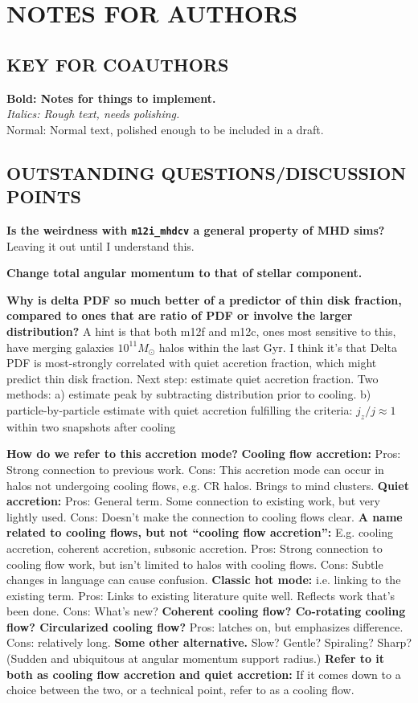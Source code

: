 \documentclass[fleqn,usenatbib]{mnras}
\begin{document}
\section{NOTES FOR AUTHORS}

\subsection{KEY FOR COAUTHORS}
\textbf{Bold: Notes for things to implement.} \\
\textit{Italics: Rough text, needs polishing.} \\
Normal: Normal text, polished enough to be included in a draft.

\subsection{OUTSTANDING QUESTIONS/DISCUSSION POINTS}

\textbf{Is the weirdness with \texttt{m12i\_mhdcv} a general property of MHD sims?}
Leaving it out until I understand this.

\textbf{Change total angular momentum to that of stellar component.}

\textbf{Why is delta PDF so much better of a predictor of thin disk fraction, compared to ones that are ratio of PDF or involve the larger distribution?}
A hint is that both m12f and m12c, ones most sensitive to this, have merging galaxies $10^11 M_\odot$ halos within the last Gyr.
I think it's that Delta PDF is most-strongly correlated with quiet accretion fraction, which might predict thin disk fraction.
Next step: estimate quiet accretion fraction.
Two methods:
a) estimate peak by subtracting distribution prior to cooling.
b) particle-by-particle estimate with quiet accretion fulfilling the criteria: $j_z/j \approx 1$ within two snapshots after cooling

\textbf{How do we refer to this accretion mode?}
\textbf{Cooling flow accretion:}
Pros: Strong connection to previous work.
Cons: This accretion mode can occur in halos not undergoing cooling flows, e.g. CR halos.
Brings to mind clusters.
\textbf{Quiet accretion:}																																									
Pros: General term. Some connection to existing work, but very lightly used.
Cons: Doesn't make the connection to cooling flows clear.
\textbf{A name related to cooling flows, but not ``cooling flow accretion'':}
E.g. cooling accretion, coherent accretion, subsonic accretion.
Pros: Strong connection to cooling flow work, but isn't limited to halos with cooling flows.
Cons: Subtle changes in language can cause confusion.
\textbf{Classic hot mode:}
i.e. linking to the existing term.
Pros: Links to existing literature quite well. Reflects work that's been done.
Cons: What's new?
\textbf{Coherent cooling flow? Co-rotating cooling flow? Circularized cooling flow?}
Pros: latches on, but emphasizes difference.
Cons: relatively long.
\textbf{Some other alternative.}
Slow?
Gentle?
Spiraling?
Sharp? (Sudden and ubiquitous at angular momentum support radius.)
\textbf{Refer to it both as cooling flow accretion and quiet accretion:}
If it comes down to a choice between the two, or a technical point, refer to as a cooling flow.
\end{document}
